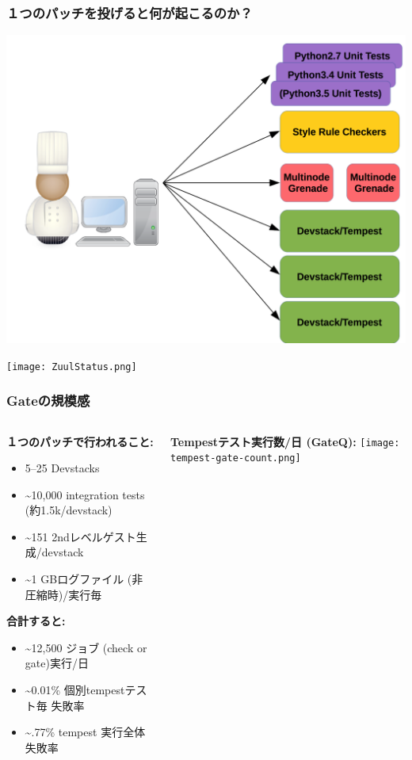 \documentclass[aspectratio=169,11pt,hyperref={colorlinks=true}]{beamer}
\begin{document}
\begin{frame}
  \frametitle{１つのパッチを投げると何が起こるのか？}
  \begin{center}
    \includegraphics[width=.7\textwidth]{jobs.png}
  \end{center}
\end{frame}

\begin{frame}
  \begin{center}
      \texttt{[image: ZuulStatus.png]}
  \end{center}
\end{frame}

\begin{frame}
\frametitle{Gateの規模感}
  \begin{columns}[T]
    \begin{column}{.50\textwidth}
      \textbf{１つのパッチで行われること:}
      \begin{itemize}
        \item 5--25 Devstacks
        \item \textasciitilde10,000 integration tests (約1.5k/devstack)
        \item \textasciitilde151 2ndレベルゲスト生成/devstack
        \item \textasciitilde1 GBログファイル (非圧縮時)/実行毎
      \end{itemize}
      \textbf{合計すると:}
      \begin{itemize}
        \item \textasciitilde12,500 ジョブ (check or gate)実行/日
        \item \textasciitilde0.01\% 個別tempestテスト毎 失敗率
        \item \textasciitilde.77\% tempest 実行全体 失敗率
      \end{itemize}
    \end{column}
    \begin{column}{.48\textwidth}
        \centering
        \textbf{Tempestテスト実行数/日 (GateQ):}
        \texttt{[image: tempest-gate-count.png]}
    \end{column}
  \end{columns}
\end{frame}
\end{document}
